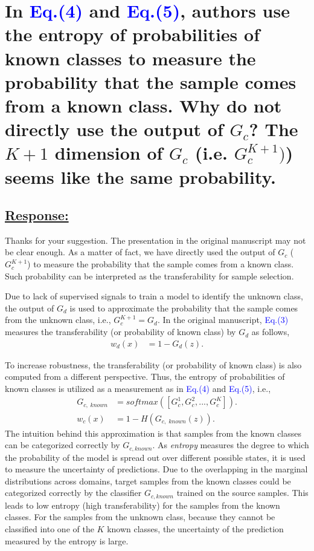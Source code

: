 \section{In \textcolor{blue}{Eq.(4)} and \textcolor{blue}{Eq.(5)}, authors use the entropy of probabilities of known classes to measure the probability that the sample comes from a known class. Why do not directly use the output of $G_c$? The $K+1$ dimension of $G_c$  (i.e. $G_c^{K+1})$) seems like the same probability. }

\subsection*{\underline{\textbf{Response:}}}

Thanks for your suggestion.
The presentation in the original manuscript may not be clear enough.
As a matter of fact, we have directly used the output of $G_c$ ($G_c^{K+1}$) to measure the probability that the sample comes from a known class.
Such probability can be interpreted as the transferability for sample selection.

Due to lack of supervised signals to train a model to identify the unknown class, the output of $G_d$ is used to approximate the probability that the sample comes from the unknown class, i.e., $G_c^{K+1} = G_d$.
In the original manuscript, \textcolor{blue}{Eq.(3)} measures the transferability (or probability of known class) by $G_d$ as follows,
\begin{align}
    w_d(x) &= 1-G_d(z). \label{eq: domain transferability}
\end{align}

To increase robustness, the transferability (or probability of known class) is also computed from a different perspective.
Thus, the entropy of probabilities of known classes is utilized as a measurement as in \textcolor{blue}{Eq.(4)} and \textcolor{blue}{Eq.(5)}, i.e.,
\begin{align}
    G_{c,\; known} &= softmax([G_c^1,G_c^2,...,G_c^K]).\\
    w_c(x) &= 1-H(G_{c,\; known}(z)). \label{eq: class transferability}
\end{align}
The intuition behind this approximation is that samples from the known classes can be categorized correctly by $G_{c, known}$.
As \textit{entropy} measures the degree to which the probability of the model is spread out over different possible states, it is used to measure the uncertainty of predictions.
Due to the overlapping in the marginal distributions across domains, target samples from the known classes could be categorized correctly by the classifier $G_{c, known}$ trained on the source samples.
This leads to low entropy (high transferability) for the samples from the known classes.
For the samples from the unknown class, because they cannot be classified into one of the $K$ known classes, the uncertainty of the prediction measured by the entropy is large.

